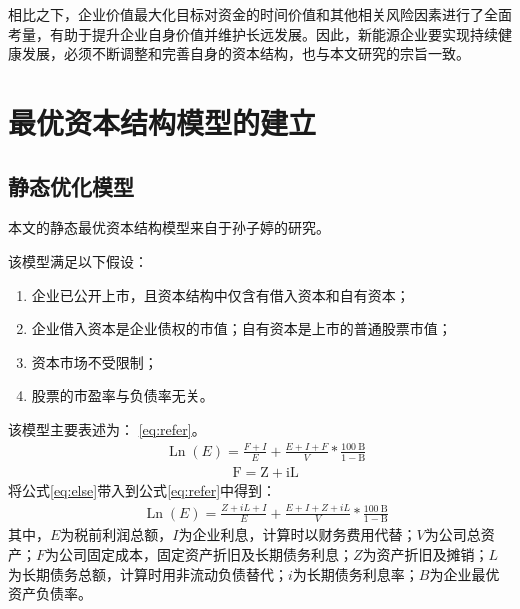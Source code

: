 相比之下，企业价值最大化目标对资金的时间价值和其他相关风险因素进行了全面考量，有助于提升企业自身价值并维护长远发展。因此，新能源企业要实现持续健康发展，必须不断调整和完善自身的资本结构，也与本文研究的宗旨一致。

\section{最优资本结构模型的建立}
\subsection{静态优化模型}
本文的静态最优资本结构模型来自于孙子婷的研究\cite{Sun2020}。

该模型满足以下假设：
\begin{enumerate}[label=(\arabic*)]
    \item 企业已公开上市，且资本结构中仅含有借入资本和自有资本；
    \item 企业借入资本是企业债权的市值；自有资本是上市的普通股票市值；
    \item 资本市场不受限制；
    \item 股票的市盈率与负债率无关。
\end{enumerate}
该模型主要表述为：
\eqref{eq:refer}。
\begin{equation}
\begin{aligned}
& \operatorname{Ln}(E)=\frac{F+I}{E}+\frac{E+I+F}{V} * \frac{100 \mathrm{~B}}{1-\mathrm{B}} 
  \label{eq:refer}
\end{aligned}
\end{equation}
\begin{equation}
\begin{aligned}
& \mathrm{F}=\mathrm{Z}+\mathrm{iL}
\label{eq:else}
\end{aligned}
\end{equation}
将公式\eqref{eq:else}带入到公式\eqref{eq:refer}中得到：
\begin{equation}
\begin{aligned}
& \operatorname{Ln}(E)=\frac{Z+iL+I}{E}+\frac{E+I+Z+iL}{V} * \frac{100 \mathrm{~B}}{1-\mathrm{B}} 
  \label{eq:main}
\end{aligned}
\end{equation}
其中，$E$为税前利润总额，$I$为企业利息，计算时以财务费用代替；$V$为公司总资产；$F$为公司固定成本，固定资产折旧及长期债务利息；$Z$为资产折旧及摊销；$L$为长期债务总额，计算时用非流动负债替代；$i$为长期债务利息率；$B$为企业最优资产负债率。
